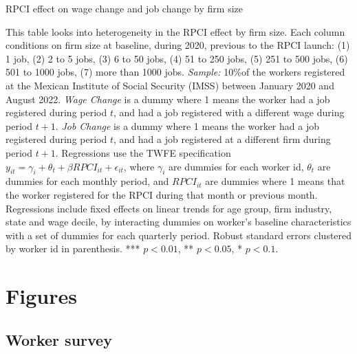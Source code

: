 \documentclass[oneside,11pt]{article}
\begin{document}
\begin{landscape}

\begin{table}[H]
    \caption{RPCI effect on wage change and job change by firm size}
    \label{twfe_change_hetero_firm_size}
    \begin{center}
    \scriptsize{}
    \end{center}
\end{table}
\scriptsize{
\noindent This table looks into heterogeneity in the RPCI effect by firm size. Each column conditions on firm size at baseline, during 2020, previous to the RPCI launch: (1) 1 job, (2) 2 to 5 jobs, (3) 6 to 50 jobs, (4) 51 to 250 jobs, (5) 251 to 500 jobs, (6) 501 to 1000 jobs, (7) more than 1000 jobs. \textit{Sample:} 10\%of the workers registered at the Mexican Institute of Social Security (IMSS) between January 2020 and August 2022. \textit{Wage Change} is a dummy where 1 means the worker had a job registered during period $t$, and had a job registered with a different wage during period $t+1$. \textit{Job Change} is a dummy where 1 means the worker had a job registered during period $t$, and had a job registered at a different firm during period $t+1$. Regressions use the TWFE specification $y_{it} = \gamma_{i} + \theta_{t}+ \beta RPCI_{it} +\epsilon_{it}$, where $\gamma_{i}$ are dummies for each worker id, $\theta_{t}$ are dummies for each monthly period, and $RPCI_{it}$ are dummies where 1 means that the worker registered for the RPCI during that month or previous month. Regressions include fixed effects on linear trends for age group, firm industry, state and wage decile, by interacting dummies on worker's baseline characteristics with a set of dummies for each quarterly period. Robust standard errors clustered by worker id in parenthesis. *** $p<0.01$, ** $p<0.05$, * $p<0.1$.
}

\end{landscape}




\clearpage
\singlespacing

\section{Figures}

\subsection{Worker survey}
\end{document}
